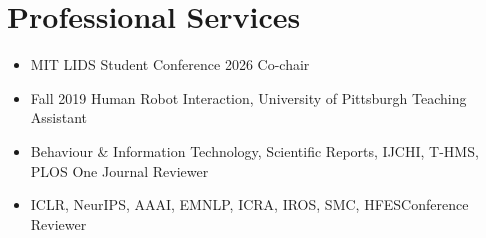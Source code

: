 \documentclass[10pt,letterpaper,roman]{moderncv}        %
\begin{document}
\section{Professional Services}


\begin{itemize}

\item{MIT LIDS Student Conference 2026 \hfill Co-chair}
\item{Fall 2019 Human Robot Interaction, University of Pittsburgh  \hfill Teaching Assistant}
\item{Behaviour \& Information Technology, Scientific Reports, IJCHI, T-HMS, PLOS One \hfill Journal Reviewer}
\item{ICLR, NeurIPS, AAAI, EMNLP, ICRA, IROS, SMC, HFES\hfill Conference Reviewer}
\end{itemize}











\end{document}
